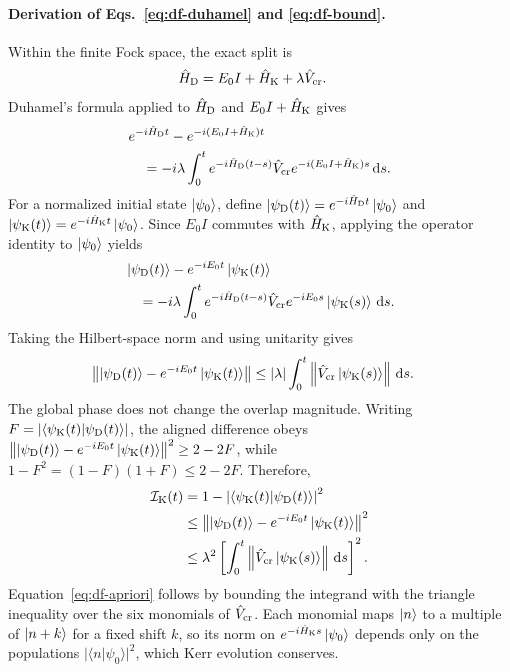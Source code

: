 \documentclass[pra,twocolumn,superscriptaddress,nofootinbib,floatfix]{revtex4-2}
\theoremstyle{remark}
\newcommand{\revcolor}{\color{blue}}
\DeclareRobustCommand{\rev}[1]{{\revcolor #1}}
\begin{document}
\paragraph{Derivation of Eqs.~\eqref{eq:df-duhamel} and \eqref{eq:df-bound}.}
Within the finite Fock space, the exact split is
\begin{align}
\hat H_{\rm D} &= E_0I+\hat H_{\rm K}+\lambda\hat V_{\rm cr}.
\end{align}
Duhamel's formula applied to \(\hat H_{\rm D}\) and \(E_0I+\hat H_{\rm K}\) gives
\begin{align}
&e^{-i\hat H_{\rm D}t}-e^{-i(E_0I+\hat H_{\rm K})t}\nonumber\\
&\quad=-i\lambda\int_0^t e^{-i\hat H_{\rm D}(t-s)}\hat V_{\rm cr}e^{-i(E_0I+\hat H_{\rm K})s}\,{\rm d}s.
\end{align}
For a normalized initial state \(\ket{\psi_0}\), define \(\ket{\psi_{\rm D}(t)}=e^{-i\hat H_{\rm D}t}\ket{\psi_0}\) and \(\ket{\psi_{\rm K}(t)}=e^{-i\hat H_{\rm K}t}\ket{\psi_0}\). Since \(E_0I\) commutes with \(\hat H_{\rm K}\), applying the operator identity to \(\ket{\psi_0}\) yields
\begin{align}
&\ket{\psi_{\rm D}(t)}-e^{-iE_0t}\ket{\psi_{\rm K}(t)}\nonumber\\
&\quad=-i\lambda\int_0^t e^{-i\hat H_{\rm D}(t-s)}\hat V_{\rm cr}e^{-iE_0s}\ket{\psi_{\rm K}(s)}\,{\rm d}s.
\end{align}
Taking the Hilbert-space norm and using unitarity gives
\begin{align}
\left\|\ket{\psi_{\rm D}(t)}-e^{-iE_0t}\ket{\psi_{\rm K}(t)}\right\| &\leq |\lambda|\int_0^t\left\|\hat V_{\rm cr}\ket{\psi_{\rm K}(s)}\right\|\,{\rm d}s.
\end{align}
The global phase does not change the overlap magnitude. Writing \(F=\left|\braket{\psi_{\rm K}(t)}{\psi_{\rm D}(t)}\right|\), the aligned difference obeys \(\left\|\ket{\psi_{\rm D}(t)}-e^{-iE_0t}\ket{\psi_{\rm K}(t)}\right\|^2\geq2-2F\), while \(1-F^2=(1-F)(1+F)\leq2-2F\). Therefore,
\begin{align}
\mathcal I_{\rm K}(t) &=1-\left|\braket{\psi_{\rm K}(t)}{\psi_{\rm D}(t)}\right|^2 \nonumber\\
&\leq \left\|\ket{\psi_{\rm D}(t)}-e^{-iE_0t}\ket{\psi_{\rm K}(t)}\right\|^2 \nonumber\\
&\leq \lambda^2\left[\int_0^t\left\|\hat V_{\rm cr}\ket{\psi_{\rm K}(s)}\right\|\,{\rm d}s\right]^2.
\end{align}
\rev{Equation~\eqref{eq:df-apriori} follows by bounding the integrand with the triangle inequality over the six monomials of \(\hat V_{\rm cr}\).} \rev{Each monomial maps \(\ket n\) to a multiple of \(\ket{n+k}\) for a fixed shift \(k\), so its norm on \(e^{-i\hat H_{\rm K}s}\ket{\psi_0}\) depends only on the populations \(|\langle n|\psi_0\rangle|^2\), which Kerr evolution conserves.}
\end{document}

